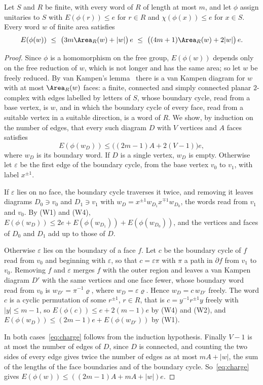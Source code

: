 \begin{lemma}\label{lem:charged-area}
Let $S$ and $R$ be finite, with every word of $R$ of length at most $m$, and let $\phi$ assign unitaries to $S$ with $E(\phi(r))\le e$ for $r\in R$
and $\chi(\phi(x))\le e$ for $x\in S$. Every word $w$ of finite area satisfies
\[
E(\phi(w))\ \le\ \bigl(3m\Area_R(w)+|w|\bigr)\,e\ \le\ \bigl((4m+1)\Area_R(w)+2|w|\bigr)\,e .
\]
\end{lemma}

\begin{proof}
Since $\phi$ is a homomorphism on the free group, $E(\phi(w))$ depends only on the free reduction of $w$, which is not longer and has the same
area; so let $w$ be freely reduced. By van Kampen's lemma~\cite[Chapter~V]{LyndonSchupp1977} there is a van Kampen diagram for $w$ with at most
$\Area_R(w)$ faces: a finite, connected and simply connected planar $2$-complex with edges labelled by letters of $S$, whose boundary cycle, read
from a base vertex, is $w$, and in which the boundary cycle of every face, read from a suitable vertex in a suitable direction, is a word of $R$.
We show, by induction on the number of edges, that every such diagram $D$ with $V$ vertices and $A$ faces satisfies
\begin{equation}\label{eq:charge}
E(\phi(w_D))\le\bigl((2m-1)A+2(V-1)\bigr)e ,
\end{equation}
where $w_D$ is its boundary word. If $D$ is a single vertex, $w_D$ is empty. Otherwise let $\varepsilon$ be the first edge of the boundary cycle,
from the base vertex $v_0$ to $v_1$, with label $x^{\pm1}$.

If $\varepsilon$ lies on no face, the boundary cycle traverses it twice, and removing it leaves diagrams $D_0\ni v_0$ and $D_1\ni v_1$ with
$w_D=x^{\pm1}w_{D_1}x^{\mp1}w_{D_0}$, the words read from $v_1$ and $v_0$. By (W1) and (W4), $E(\phi(w_D))\le2e+E(\phi(w_{D_1}))+E(\phi(w_{D_0}))$, and
the vertices and faces of $D_0$ and $D_1$ add up to those of $D$.

Otherwise $\varepsilon$ lies on the boundary of a face $f$. Let $c$ be the boundary cycle of $f$ read from $v_0$ and beginning with $\varepsilon$,
so that $c=\varepsilon\pi$ with $\pi$ a path in $\partial f$ from $v_1$ to $v_0$. Removing $f$ and $\varepsilon$ merges $f$ with the outer
region and leaves a van Kampen diagram $D'$ with the same vertices and one face fewer, whose boundary word read from $v_0$ is
$w_{D'}=\pi^{-1}\varrho$, where $w_D=\varepsilon\varrho$. Hence
$w_D=c\,w_{D'}$ freely. The word $c$ is a cyclic permutation of some $r^{\pm1}$, $r\in R$, that is $c=y^{-1}r^{\pm1}y$ freely with $|y|\le m-1$, so
$E(\phi(c))\le e+2(m-1)e$ by (W4) and (W2), and $E(\phi(w_D))\le(2m-1)e+E(\phi(w_{D'}))$ by (W1).

In both cases~\eqref{eq:charge} follows from the induction hypothesis. Finally $V-1$ is at most the number of edges of $D$, since $D$ is
connected, and counting the two sides of every edge gives twice the number of edges as at most $mA+|w|$, the sum of the lengths of the face
boundaries and of the boundary cycle. So~\eqref{eq:charge} gives $E(\phi(w))\le((2m-1)A+mA+|w|)e$.
\end{proof}

